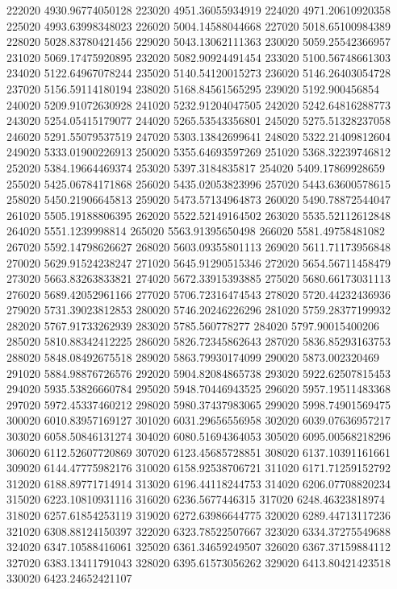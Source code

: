 {222020 4930.96774050128
223020 4951.36055934919
224020 4971.20610920358
225020 4993.63998348023
226020 5004.14588044668
227020 5018.65100984389
228020 5028.83780421456
229020 5043.13062111363
230020 5059.25542366957
231020 5069.17475920895
232020 5082.90924491454
233020 5100.56748661303
234020 5122.64967078244
235020 5140.54120015273
236020 5146.26403054728
237020 5156.59114180194
238020 5168.84561565295
239020 5192.900456854
240020 5209.91072630928
241020 5232.91204047505
242020 5242.64816288773
243020 5254.05415179077
244020 5265.53543356801
245020 5275.51328237058
246020 5291.55079537519
247020 5303.13842699641
248020 5322.21409812604
249020 5333.01900226913
250020 5355.64693597269
251020 5368.32239746812
252020 5384.19664469374
253020 5397.3184835817
254020 5409.17869928659
255020 5425.06784171868
256020 5435.02053823996
257020 5443.63600578615
258020 5450.21906645813
259020 5473.57134964873
260020 5490.78872544047
261020 5505.19188806395
262020 5522.52149164502
263020 5535.52112612848
264020 5551.1239998814
265020 5563.91395650498
266020 5581.49758481082
267020 5592.14798626627
268020 5603.09355801113
269020 5611.71173956848
270020 5629.91524238247
271020 5645.91290515346
272020 5654.56711458479
273020 5663.83263833821
274020 5672.33915393885
275020 5680.66173031113
276020 5689.42052961166
277020 5706.72316474543
278020 5720.44232436936
279020 5731.39023812853
280020 5746.20246226296
281020 5759.28377199932
282020 5767.91733262939
283020 5785.560778277
284020 5797.90015400206
285020 5810.88342412225
286020 5826.72345862643
287020 5836.85293163753
288020 5848.08492675518
289020 5863.79930174099
290020 5873.002320469
291020 5884.98876726576
292020 5904.82084865738
293020 5922.62507815453
294020 5935.53826660784
295020 5948.70446943525
296020 5957.19511483368
297020 5972.45337460212
298020 5980.37437983065
299020 5998.74901569475
300020 6010.83957169127
301020 6031.29656556958
302020 6039.07636957217
303020 6058.50846131274
304020 6080.51694364053
305020 6095.00568218296
306020 6112.52607720869
307020 6123.45685728851
308020 6137.10391161661
309020 6144.47775982176
310020 6158.92538706721
311020 6171.71259152792
312020 6188.89771714914
313020 6196.44118244753
314020 6206.07708820234
315020 6223.10810931116
316020 6236.5677446315
317020 6248.46323818974
318020 6257.61854253119
319020 6272.63986644775
320020 6289.44713117236
321020 6308.88124150397
322020 6323.78522507667
323020 6334.37275549688
324020 6347.10588416061
325020 6361.34659249507
326020 6367.37159884112
327020 6383.13411791043
328020 6395.61573056262
329020 6413.80421423518
330020 6423.24652421107
}
